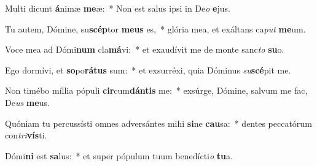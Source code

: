 \item Multi dicunt \textbf{á}nimæ \textbf{me}æ:~* Non est salus ipsi in De\textit{o} \textbf{e}jus.
\item Tu autem, Dómine, su\textbf{scép}tor \textbf{me}\textbf{us} es,~* glória mea, et exáltans ca\textit{put} \textbf{me}um.
\item Voce mea ad Dómi\textbf{num} cla\textbf{má}vi:~* et exaudívit me de monte sanc\textit{to} \textbf{su}o.
\item Ego dormívi, et \textbf{so}po\textbf{rá}\textbf{tus} sum:~* et exsurréxi, quia Dóminus \textit{su}\textbf{scé}pit me.
\item Non timébo míllia pópuli \textbf{cir}cum\textbf{dán}\textbf{tis} me:~* exsúrge, Dómine, salvum me fac, De\textit{us} \textbf{me}us.
\item Quóniam tu percussísti omnes adversántes mihi \textbf{si}ne \textbf{cau}sa:~* dentes peccatórum con\textit{tri}\textbf{vís}ti.
\item Dómi\textbf{ni} est \textbf{sa}lus:~* et super pópulum tuum benedícti\textit{o} \textbf{tu}a.
